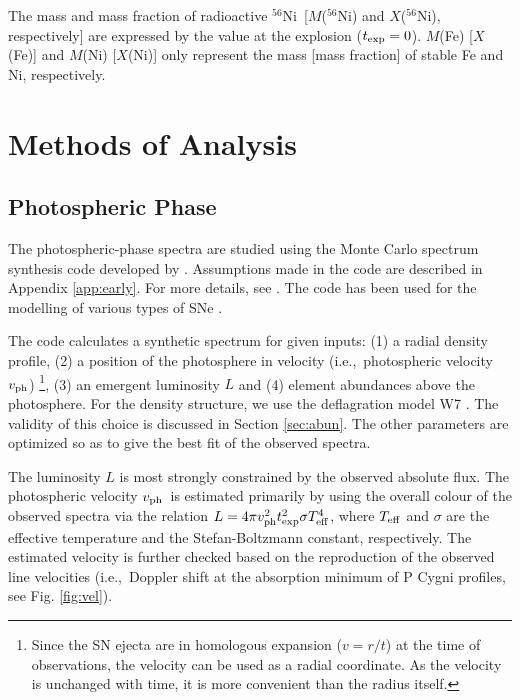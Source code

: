 \documentclass[usegraphicx,usenatbib]{mn2e}
\newcommand{\eg}{e.g.,\ }
\newcommand{\ie}{i.e.,\ }
\newcommand{\vph}{$v_{\rm ph}$}
\newcommand{\Nifs}{$^{56}$Ni}
\newcommand{\texp}{t_{\rm exp}}
\begin{document}
The mass and mass fraction of radioactive \Nifs\ [$M$(\Nifs) and $X$(\Nifs),
respectively] are expressed by the value at the explosion ($\texp=0$). $M$(Fe)
[$X$(Fe)] and $M$(Ni) [$X$(Ni)] only represent the mass [mass fraction] of
stable Fe and Ni, respectively.


\section{Methods of Analysis}
\label{sec:method}

\subsection{Photospheric Phase}

The photospheric-phase spectra are studied using the Monte Carlo spectrum
synthesis code developed by \citet{mazzalilucy93}. Assumptions made in the code
are described in Appendix \ref{app:early}. For more details, see
\citet{mazzalilucy93,lucy99,mazzali00}. The code has been used for the modelling of various types
of SNe \citep[\eg][]{mazzali92, mazzali93, mazzali0097ef}.

The code calculates a synthetic spectrum for given inputs:
(1) a radial density profile, (2) a position of the photosphere in velocity 
(\ie photospheric velocity \vph)
\footnote{Since the SN ejecta are in homologous expansion 
($v = r/t$) at the time of observations,
the velocity can be used as a radial coordinate.
As the velocity is unchanged with time, 
it is more convenient than the radius itself.},
(3) an emergent luminosity $L$ and 
(4) element abundances above the photosphere.
For the density structure, we use the deflagration model W7 \citep{nomoto84}.
The validity of this choice is discussed in Section \ref{sec:abun}.
The other parameters are optimized so as to give the best fit of the 
observed spectra.

The luminosity $L$ is most strongly constrained by the observed absolute flux.
The photospheric velocity \vph\ is estimated primarily by using  the
overall colour of the observed spectra via the relation $L = 4 \pi v_{\rm ph}^2
\texp^2 \sigma T_{\rm eff}^4$,  where $T_{\rm eff}$ and $\sigma$ are the
effective temperature and the Stefan-Boltzmann constant, respectively. The
estimated velocity is further checked based on the reproduction of the observed
line velocities  (\ie Doppler shift at the absorption minimum of P Cygni
profiles,  see Fig. \ref{fig:vel}).
\end{document}
